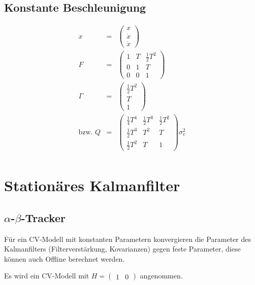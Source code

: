 \subsection{Konstante Beschleunigung}
\begin{eqnarray*}
    x &=& \begin{pmatrix} x \\ \dot{x} \\ \ddot{x} \end{pmatrix} \\
    F &=& \begin{pmatrix} 1 & T & \frac{1}{2} T^2 \\ 0 & 1 & T \\ 0 & 0 & 1 \end{pmatrix} \\
    \Gamma &=& \begin{pmatrix} \frac{1}{2} T^2 \\ T \\ 1 \end{pmatrix} \\
    \text{bzw. } Q &=& 
        \begin{pmatrix} 
            \frac{1}{4} T^4 & \frac{1}{2} T^3 & \frac{1}{2} T^2 \\ 
            \frac{1}{2} T^3 & T^2 & T \\
            \frac{1}{2} T^2 & T & 1 
        \end{pmatrix}
        \sigma^2_v \\
\end{eqnarray*}

\section{Stationäres Kalmanfilter}
\subsection{$\alpha$-$\beta$-Tracker}
Für ein CV-Modell mit konstanten Parametern konvergieren die Parameter des Kalmanfilters 
(Filterverstärkung, Kovarianzen) gegen feste Parameter, diese können auch Offline berechnet werden.

Es wird ein CV-Modell mit $H = \begin{pmatrix} 1 & 0 \end{pmatrix}$ angenommen.

